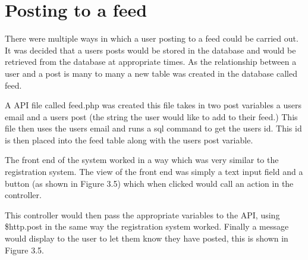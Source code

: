 \section{Posting to a feed}
There were multiple ways in which a user posting to a feed could be carried out. It was decided that a users posts would be stored in the database and would be retrieved from the database at appropriate times. As the relationship between a user and a post is many to many a new table was created in the database called feed. 

A API file called feed.php was created this file takes in two post variables a users email and a users post (the string the user would like to add to their feed.) This file then uses the users email and runs a sql command to get the users id. This id is then placed into the feed table along with the users post variable.

The front end of the system worked in a way which was very similar to the registration system. The view of the front end was simply a text input field and a button (as shown in Figure 3.5) which when clicked would call an action in the controller.

This controller would then pass the appropriate variables to the API, using \$http.post in the same way the registration system worked. Finally a message would display to the user to let them know they have posted, this is shown in Figure 3.5.

